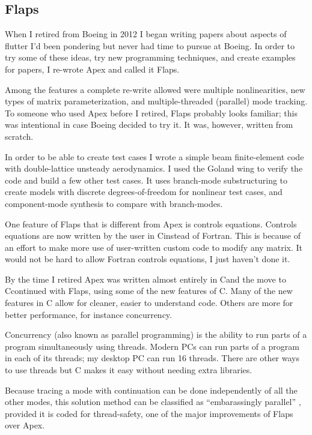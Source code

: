 \documentclass[11pt,openany,twoside]{book}
\numberwithin{equation}{section}		%
\def\Cpp{{C\nolinebreak[4]\hspace{-.05em}\raisebox{.4ex}{\tiny\bf ++}}\:}
\begin{document}
\subsection{Flaps}
When I retired from Boeing in 2012 I began writing papers about
aspects of flutter I'd been pondering but never had time to pursue
at Boeing. In order to try some of these ideas, try new
programming techniques, and create examples for papers, I re-wrote Apex
and called it Flaps.

Among the features a complete re-write allowed were multiple nonlinearities,
new types of matrix parameterization, and multiple-threaded
(parallel) mode tracking.
To someone who used Apex before I retired, Flaps probably
looks familiar; this was intentional in case Boeing decided to try it.
It was, however, written from scratch.

In order to be able to create test cases I wrote a simple beam
finite-element code with double-lattice unsteady aerodynamics. I used
the Goland wing to verify the code and build a few other test cases.
It uses branch-mode substructuring to create models with discrete
degrees-of-freedom for nonlinear test cases, and component-mode
synthesis to compare with branch-modes.

One feature of Flaps that is different from Apex is controls equations.
Controls equations are now written by the user in \Cpp instead of
Fortran. This is because of an effort to make more use of user-written
custom code to modify any matrix. It would not be hard to allow
Fortran controls equations, I just haven't done it.


By the time I retired Apex was written almost entirely in \Cpp and
the move to \Cpp continued with Flaps, using some of the new features
of \Cpp -11.
Many of the new features in \Cpp -11 allow for cleaner, easier to
understand code. Others are more for better performance, for instance
concurrency.

Concurrency (also known as parallel programming) is the ability to run
parts of a program simultaneously using threads. Modern PCs can run
parts of a program in each of its threads; my desktop PC can run 16
threads. There are other ways to use threads but \Cpp -11 makes it easy
without needing extra libraries.

Because tracing a mode with continuation can be done independently of
all the other modes, this solution method can be classified as
``embarassingly parallel'' \cite{williams2009c++}, provided it is coded
for thread-safety, one of the major improvements of Flaps over Apex.
\end{document}
